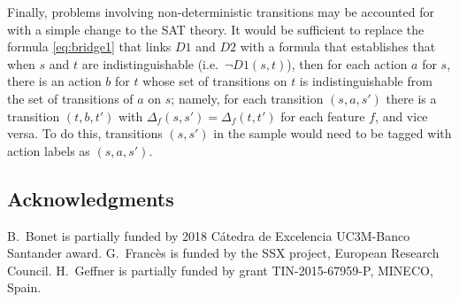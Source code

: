 \documentclass[letterpaper]{article} %
\begin{document}
Finally, problems involving non-deterministic transitions may be
accounted for with a simple change to the SAT theory.
It would be sufficient to replace the formula \eqref{eq:bridge1}
that links $D1$ and $D2$ with a formula that establishes that when
$s$ and $t$ are indistinguishable (i.e.\ $\neg D1(s,t)$), then
for each action $a$ for $s$, there is an action $b$ for $t$ whose
set of transitions on $t$ is indistinguishable from the set
of transitions of $a$ on $s$; namely, for each transition $(s,a,s')$
there is a transition $(t,b,t')$ with $\Delta_f(s,s')=\Delta_f(t,t')$
for each feature $f$, and vice versa.
To do this, transitions $(s,s')$ in the sample would need to be
tagged with action labels as $(s,a,s')$.

\subsection*{Acknowledgments}
B.\ Bonet is partially funded by 2018 C\'atedra de Excelencia UC3M-Banco Santander award.
G.\ Franc\`{e}s is funded by the SSX project, European Research Council.
H.\ Geffner is partially funded by grant TIN-2015-67959-P, MINECO, Spain.



\end{document}
